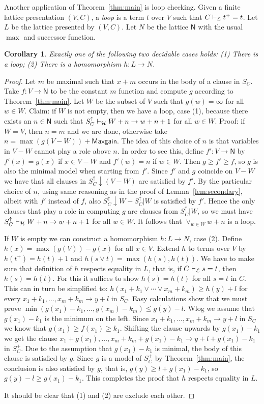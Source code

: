 \documentclass[11pt,a4paper]{article}
\newtheorem{corollary}{Corollary}[theorem]
\newcommand{\N}{\mathsf{N}}
\newcommand\jterm[3]{{{#1_1}+{#2_1}}\vee\cdots\vee{{#1_#3}+{#2_#3}}}
\newcommand\jbody[3]{{{#1_1}+{#2_1}},\ldots,{{#1_#3}+{#2_#3}}}
\newcommand\lathy{{\cal L}}
\newcommand\prvL{\vdash_{\lathy}}
\newcommand\prvH{\vdash_{\cal H}}
\newcommand\M{\mathsf{Maxgain}}
\begin{document}
Another application of Theorem~\ref{thm:main} is loop checking.
Given a finite lattice presentation $(V,C)$, a \emph{loop} is a 
term $t$ over $V$ such that $C\prvL t^+=t$. Let $L$ be the
lattice presented by $(V,C)$. Let $N$ be the lattice $\N$ with
the usual $\max$ and successor function.

\begin{corollary}\label{cor:loopchecking}
Exactly one of the following two decidable cases holds:
(1) There is a loop;
(2) There is a homomorphism $h: L\to N$.
\end{corollary}
\begin{proof}
Let $m$ be maximal such that $x+m$ occurs in the body of a clause in $S_C$.
Take $f: V\to\N$ to be the constant $m$ function and compute $g$ according
to Theorem~\ref{thm:main}. Let $W$ be the subset of $V$ such that 
$g(w)=\infty$ for all $w\in W$. Claim: if $W$ is not empty,
then we have a loop, case (1), because there exists an $n\in\N$ such that 
$S^\uparrow_C\prvH W+n \to w+n+1$ for all $w\in W$.
{\color{red} Proof: if $W=V$, then $n=m$ and we are done,
otherwise take $n= \max(g(V-W))+\M$. The idea of this choice of $n$ is 
that variables in $V-W$ cannot play a role above $n$.
In order to see this, define $f': V\to\N$ by $f'(x)=g(x)$ if $x\in V-W$
and $f'(w)=n$ if $w\in W$. Then $g\geq f'\geq f$, so $g$ is also the minimal 
model when starting from $f'$. Since $f'$ and $g$ coincide on $V-W$ we have
that all clauses in $S^\uparrow_C{\downarrow}(V-W)$ are satisfied by $f'$.
By the particular choice of $n$, using same reasoning as in the proof of 
Lemma~\ref{lem:secondary}, albeit with $f'$ instead of $f$, also
$S^\uparrow_C{\downarrow}W - S^\uparrow_C|W$ is satisfied by $f'$.
Hence the only clauses that play a role in computing $g$ are
clauses from $S^\uparrow_C|W$, so we must have 
$S^\uparrow_C\prvH W+n \to w+n+1$ for all $w\in W$.
It follows that $\vee_{w\in W} w+n$ is a loop.}

If $W$ is empty we can construct a homomorphism $h: L\to N$, case (2).
Define $h(x) = \max(g(V))- g(x)$ for all $x\in V$. 
Extend $h$ to terms over $V$ by $h(t^+) = h(t)+1$ 
and $h(s\vee t) = \max(h(s),h(t))$.
We have to make sure that definition of $h$ respects
equality in $L$, that is, if $C\prvL s=t$, then $h(s)=h(t)$.
For this it suffices to show $h(s)=h(t)$ for all $s=t$ in $C$.
This can in turn be simplified to: $h(\jterm{x}{k}{m}) \geq h(y)+l$ 
for every $\jbody{x}{k}{m} \to y+l$ in $S_C$.
Easy calculations show that we must prove
$\min(g(x_1)-k_1,\ldots,g(x_m)-k_m) \leq g(y)-l$.
Wlog we assume that $g(x_1)-k_1$ is the minimum on the left.
Since $\jbody{x}{k}{m} \to y+l$ in $S_C$ we know 
that $g(x_1)\geq f(x_1)\geq k_1$. Shifting the clause
upwards by $g(x_1)-k_1$ we get the clause
$x_1+g(x_1),\ldots,x_m+k_m+g(x_1)-k_1 \to y+l+g(x_1)-k_1$
in $S_C^+$. Due to the assumption that $g(x_1)-k_1$ is minimal,
the body of this clause is satisfied by $g$.
Since $g$ is a model of $S_C^+$ by Theorem~\ref{thm:main},
the conclusion is also satisfied by $g$, that is,
$g(y)\geq l+g(x_1)-k_1$, so $g(y)-l\geq g(x_1)-k_1$.
This completes the proof that $h$ respects equality in $L$.

It should be clear that (1) and (2) are exclude each other.
\end{proof}
\end{document}
